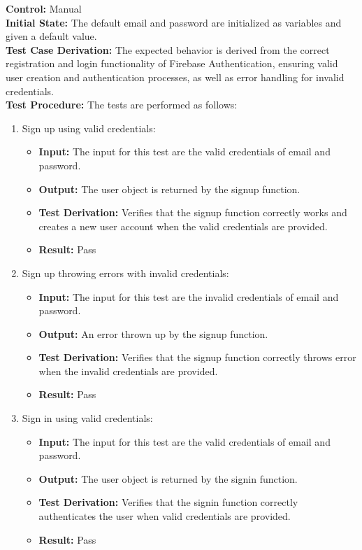 \documentclass[12pt, titlepage]{article}
\begin{document}
  \textbf{Control:} Manual \\
  \textbf{Initial State:} The default email and password are initialized as variables and given a default value.\\
  \textbf{Test Case Derivation:} The expected behavior is derived from the correct registration and login functionality of Firebase Authentication, ensuring valid user creation and authentication processes, as well as error handling for invalid credentials.\\
  \textbf{Test Procedure:} The tests are performed as follows:
  \begin{enumerate}
    \item Sign up using valid credentials:
      \begin{itemize}
        \item \textbf{Input:} The input for this test are the valid credentials of email and password.
        \item \textbf{Output:} The user object is returned by the signup function.
        \item \textbf{Test Derivation:} Verifies that the signup function correctly works and creates a new user account when the valid credentials are provided.
        \item \textbf{Result:} Pass 
      \end{itemize}

    \item Sign up throwing errors with invalid credentials:
      \begin{itemize}
        \item \textbf{Input:} The input for this test are the invalid credentials of email and password.
        \item \textbf{Output:} An error thrown up by the signup function.
        \item \textbf{Test Derivation:} Verifies that the signup function correctly throws error when the invalid credentials are provided.
        \item \textbf{Result:} Pass 
      \end{itemize}

    \item Sign in using valid credentials:
      \begin{itemize}
        \item \textbf{Input:} The input for this test are the valid credentials of email and password. 
        \item \textbf{Output:} The user object is returned by the signin function.
        \item \textbf{Test Derivation:}  Verifies that the signin function correctly authenticates the user when valid credentials are provided.
        \item \textbf{Result:} Pass 
      \end{itemize}


\end{enumerate}
\end{document}
